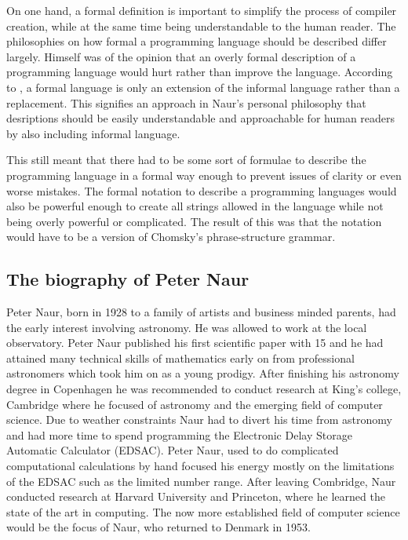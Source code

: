 \documentclass{article}
\begin{document}
On one hand, a formal definition is important to simplify the process of compiler creation, while at the same time being understandable to the human reader. The philosophies on how formal a programming language should be described differ largely. \cite{naur1982formalization} Himself was of the opinion that an overly formal description of a programming language would hurt rather than improve the language. According to \cite{naur1982formalization}, a formal language is only an extension of the informal language rather than a replacement. This signifies an approach in Naur's personal philosophy that desriptions should be easily understandable and approachable for human readers by also including informal language. 

This still meant that there had to be some sort of formulae to describe the programming language in a formal way enough to prevent issues of clarity or even worse mistakes. The formal notation to describe a programming languages would also be powerful enough to create all strings allowed in the language while not being overly powerful or complicated. The result of this was that the notation would have to be a version of Chomsky's phrase-structure grammar.

\subsection{The biography of Peter Naur}
Peter Naur, born in 1928 to a family of artists and business minded parents, had the early interest involving astronomy. He was allowed to work at the local observatory. Peter Naur published his first scientific paper with 15 and he had attained many technical skills of mathematics early on from professional astronomers which took him on as a young prodigy. After finishing his astronomy degree in Copenhagen he was recommended to conduct research at King's college, Cambridge where he focused of astronomy and the emerging field of computer science. Due to weather constraints Naur had to divert his time from astronomy and had more time to spend programming the Electronic Delay Storage Automatic Calculator (EDSAC). Peter Naur, used to do complicated computational calculations by hand focused his energy mostly on the limitations of the EDSAC such as the limited number range. After leaving Combridge, Naur conducted research at Harvard University and Princeton, where he learned the state of the art in computing. The now more established field of computer science would be the focus of Naur, who returned to Denmark in 1953.
\end{document}

